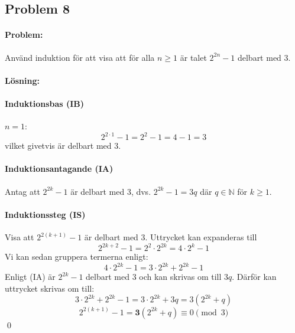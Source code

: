 \subsection*{Problem 8}

\paragraph{Problem:} Använd induktion för att visa att för alla $n\ge 1$ är talet $2^{2n}-1$ delbart med 3.

\paragraph{Lösning:}

\paragraph{Induktionsbas (IB)} $n=1$:
\[2^{2\cdot1}-1 = 2^2-1 = 4-1 = 3\]
vilket givetvis är delbart med 3.

\paragraph{Induktionsantagande (IA)} Antag att $2^{2k}-1$ är delbart med 3, dvs. $2^{2k}-1 = 3q$ där $q \in \mathbb{N}$ för $k\ge1.$ 

\paragraph{Induktionssteg (IS)} Visa att $2^{2(k+1)}-1$ är delbart med 3.\newline
Uttrycket kan expanderas till
\[2^{2k+2}-1 = 2^2\cdot2^{2k} = 4\cdot2^{k}-1\]
Vi kan sedan gruppera termerna enligt:
\[4\cdot2^{2k}-1 = 3\cdot2^{2k} + 2^{2k}-1\]
Enligt (IA) är $2^{2k}-1$ delbart med 3 och kan skrivas om till $3q$. Därför kan uttrycket skrivas om till:
\[3\cdot2^{2k} + 2^{2k}-1 = 3\cdot2^{2k} + 3q = 3(2^{2k}+q)\]
\[2^{2(k+1)}-1=\boldsymbol{3}(2^{2k}+q) \equiv 0 \pmod{3}\]
\hfill\qed